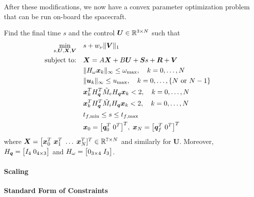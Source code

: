 \documentclass[10pt]{article}
\begin{document}
After these modifications, we now have a convex parameter optimization problem that can be run on-board the spacecraft. 

\begin{problem}\label{prob:prob2}
Find the final time $s$ and the control $\bm{U}\in{\mathbb{R}}^{3 \times N}$ such that
\begin{subequations}\label{eq:prob2}
\begin{align}
\min_{s,\bm{U},\bm{X},\bm{V}} &\quad s + w_{\nu} \| \bm{V} \|_1 \label{eq:p2_a}\\
\text{subject to:} &\quad \bm{X} = A \bm{X} + B \bm{U} + \bm{S} s + \bm{R} + \bm{V} \label{eq:p2_b}\\
&\quad \| H_{\omega} \bm{x}_k \|_{\infty} \leq \omega_{\max}, \quad k=0,\ldots,N \label{eq:p2_c}\\ 
&\quad \| \bm{u}_k \|_{\infty} \leq u_{\max}, \quad k=0,\ldots,\{N \text{ or } N-1\} \label{eq:p2_d}\\
&\quad \bm{x}_k^T H_{\bm{q}}^T \tilde{M}_e H_{\bm{q}} \bm{x}_k < 2, \quad k=0,\ldots,N \label{eq:p2_e}\\
&\quad \bm{x}_k^T H_{\bm{q}}^T \tilde{M}_i H_{\bm{q}} \bm{x}_k < 2, \quad k=0,\ldots,N \label{eq:p2_f}\\
&\quad t_{f,\min} \leq s \leq t_{f,\max} \label{eq:p2_g}\\
&\quad \bm{x}_0 = \big[ \bm{q}_0^T \; 0^T \big]^T, \; \bm{x}_N = \big[ \bm{q}_f^T \; 0^T \big]^T \label{eq:p2_h}
\end{align}
\end{subequations}
where $\bm{X} = \big[ \bm{x}_0^T \; \bm{x}_1^T \; \ldots \; \bm{x}_{N}^T ]^T \in {\mathbb{R}}^{7 \times N}$ and similarly for $\bm{U}$. Moreover, $H_{\bm{q}} = \big[ I_{4} \; 0_{4 \times 3} \big]$ and $H_{\omega} = \big[ 0_{3 \times 4} \; I_{3} \big]$.
\end{problem}

\paragraph{Scaling}

\paragraph{Standard Form of Constraints}
\end{document}
